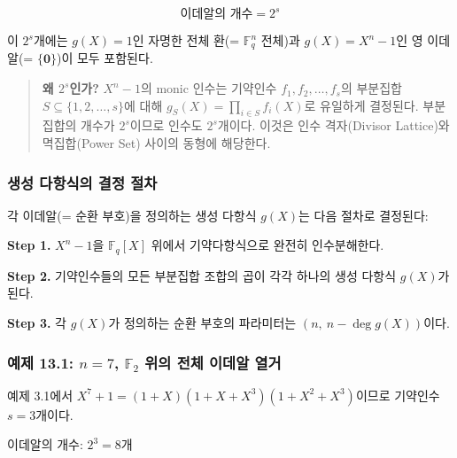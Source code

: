\documentclass[
  oneside]{article}
\begin{document}
\[\text{이데알의 개수} = 2^s\]

이 \(2^s\)개에는 \(g(X) = 1\)인 자명한 전체 환(= \(\mathbb{F}_q^n\)
전체)과 \(g(X) = X^n - 1\)인 영 이데알(= \(\{\mathbf{0}\}\))이 모두
포함된다.

\begin{quote}
\textbf{왜 \(2^s\)인가?} \(X^n - 1\)의 monic 인수는 기약인수
\(f_1, f_2, \dots, f_s\)의 부분집합 \(S \subseteq \{1, 2, \dots, s\}\)에
대해 \(g_S(X) = \prod_{i \in S} f_i(X)\)로 유일하게 결정된다. 부분집합의
개수가 \(2^s\)이므로 인수도 \(2^s\)개이다. 이것은 인수 격자(Divisor
Lattice)와 멱집합(Power Set) 사이의 동형에 해당한다.
\end{quote}

\subsubsection{생성 다항식의 결정
절차}\label{uxc0dduxc131-uxb2e4uxd56duxc2dduxc758-uxacb0uxc815-uxc808uxcc28}

각 이데알(= 순환 부호)을 정의하는 생성 다항식 \(g(X)\)는 다음 절차로
결정된다:

\textbf{Step 1.} \(X^n - 1\)을 \(\mathbb{F}_q[X]\) 위에서 기약다항식으로
완전히 인수분해한다.

\textbf{Step 2.} 기약인수들의 모든 부분집합 조합의 곱이 각각 하나의 생성
다항식 \(g(X)\)가 된다.

\textbf{Step 3.} 각 \(g(X)\)가 정의하는 순환 부호의 파라미터는
\((n,\ n - \deg g(X))\)이다.

\subsubsection{\texorpdfstring{예제 13.1: \(n = 7\), \(\mathbb{F}_2\)
위의 전체 이데알
열거}{예제 13.1: n = 7, \textbackslash mathbb\{F\}\_2 위의 전체 이데알 열거}}\label{uxc608uxc81c-13.1-n-7-mathbbf_2-uxc704uxc758-uxc804uxccb4-uxc774uxb370uxc54c-uxc5f4uxac70}

예제 3.1에서 \(X^7 + 1 = (1 + X)(1 + X + X^3)(1 + X^2 + X^3)\)이므로
기약인수 \(s = 3\)개이다.

이데알의 개수: \(2^3 = 8\)개
\end{document}
